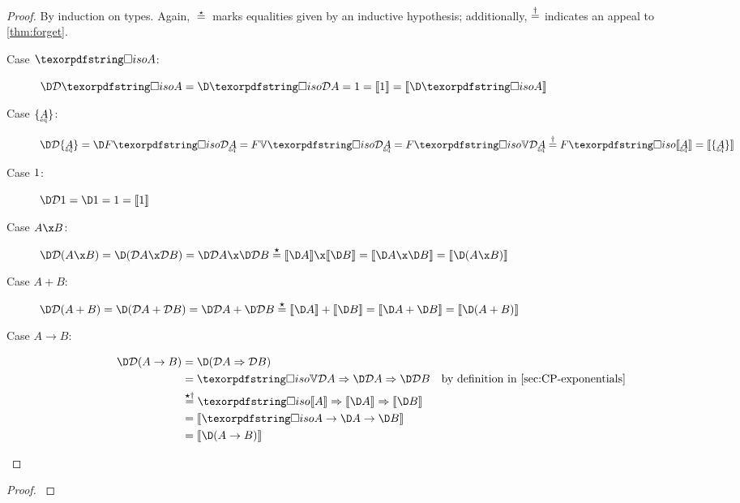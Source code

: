 \documentclass[nomarginums]{rntz}\usepackage[tablet]{fantasy}%
\begin{document}
\thmDeltaDen*
\begin{proof}
  \label{proof:delta-den}
  By induction on types. Again, $\stareq$ marks equalities given by an inductive
  hypothesis; additionally, $\overset{\dagger}{=}$ indicates an appeal to
  \cref{thm:forget}.
  \begin{description}
    \item[Case $\isof A$:] \(\chgs{\incdens{\isof A}}
      = \chgs{\discof{\incdens A}}
      = \termO = \den{1} = \den{\D \isof A}\)

    \item[Case $\tset{\eqt A}$:] \(\chgs{\incdens{\tseteq A}}
      = \chgs{\downof{\discof{\incdens{\eqt A}}}}
      = \downof{\vals{\discof{\incdens{\eqt A}}}}
      = \downof{\isof{\vals{\incdens{\eqt A}}}}
      \daggereq \downof{\isof{\den{\eqt A}}}
      = \den{\tseteq A}
      \)

    \item[Case $1$:] \(\chgs{\incdens \tunit}
      = \chgs \termO = \termO = \den{\tunit} \)

    \item[Case $A \x B$:] \(\chgs{\incden{A \x B}}
      = \chgs{(\incdens A \x \incdens B)}
      = \chgs{\incdens A} \x \chgs{\incdens B}
      \stareq \den{\D A} \x \den{\D B}
      = \den{\D A \x \D B}
      = \den{\D(A \x B)} \)

    \item[Case $A + B$:] \(\chgs{\incden{A + B}}
      = \chgs{(\incdens A + \incdens B)}
      = \chgs{\incdens A} + \chgs{\incdens B}
      \stareq \den{\D A} + \den{\D B}
      = \den{\D A + \D B}
      = \den{\D(A + B)} \)

    \item[Case $A \to B$:]
      \begin{align*}
        \chgs{\incden{A \to B}}
        &= \chgs{(\expO{\incdens A}{\incdens B})}\\
        &= \expO {\isof{\vals{\incdens A}}} {
          \expO {\chgs{\incdens A}} {\chgs{\incdens B}}}
        & \text{by definition in \cref{sec:CP-exponentials}}
        \\
        &\stardaggereq \expO {\isof {\den A}} {\expO {\den{\D A}} {\den{\D B}}}\\
        &= \den{\isof A \to \D A \to \D B}\\
        &= \den{\D(A \to B)}
      \end{align*}
  \end{description}
\end{proof}


\thmTypeCorrect*
\begin{proof}\label{proof:typeCorrect}
  \XXX
\end{proof}
\end{document}
